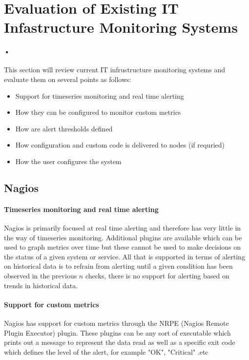 \documentclass[10pt]{article}
\begin{document}
	\section{Evaluation of Existing IT Infastructure Monitoring Systems}
		\paragraph{•}
		This section will review current IT infrustructure monitoring systems and evaluate them on
		several points as follows:
		\begin{itemize}
			\item Support for timeseries monitoring and real time alerting
			\item How they can be configured to monitor custom metrics
			\item How are alert thresholds defined
			\item How configuration and custom code is delivered to nodes (if requried)
			\item How the user configures the system
		\end{itemize}
	
	\subsection{Nagios}
	\paragraph{Timeseries monitoring and real time alerting}
	Nagios is primarily focused at real time alerting and therefore has very little in the way of 
	timeseries monitoring.  Additional plugins are available which can be used to graph metrics
	over time but these cannot be used to make decisions on the status of a given system or service.
	All that is supported in terms of alerting on historical data is to refrain from alerting until
	a given condition has been observed in the previous $n$ checks, there is no support for alerting
	based on trends in historical data.
	
	\paragraph{Support for custom metrics}
	Nagios has support for custom metrics through the NRPE (Nagios Remote Plugin Executor) plugin.
	These plugins can be any sort of executable which prints out a message to represent the data read
	as well as a specific exit code which defines the level of the alert, for example "OK", "Critical"
	.etc
	
\end{document}
